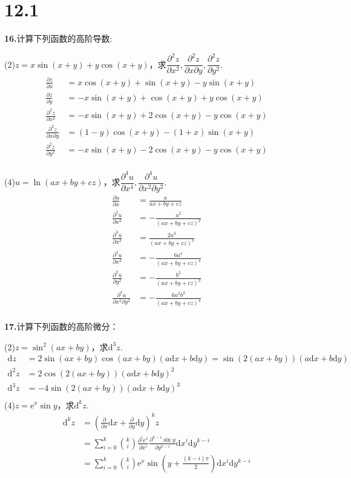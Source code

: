 \documentclass[12pt, a4paper]{article}
\newcommand{\e}{\mathrm{e}}
\newcommand{\dif}{\mathrm{d}}
\begin{document}
\section*{12.1}
\textbf{16.}计算下列函数的高阶导数:

(2)\(z = x\sin(x + y) + y\cos(x + y)\)，求\(\dfrac{\partial^2 z}{\partial x^2}, \dfrac{\partial^2 z}{\partial x \partial y}, \dfrac{\partial^2 z}{\partial y^2}\).
\begin{align*}
\frac{\partial z}{\partial x} &= x\cos(x + y) + \sin(x + y) - y\sin(x + y) \\
\frac{\partial z}{\partial y} &= -x\sin(x + y) + \cos(x + y) + y\cos(x + y) \\
\frac{\partial^2 z}{\partial x^2} &= -x\sin(x + y) + 2\cos(x + y) - y\cos(x + y) \\
\frac{\partial^2 z}{\partial x \partial y} &= (1 - y)\cos(x + y) - (1 + x)\sin(x + y) \\
\frac{\partial^2 z}{\partial y^2} &= -x\sin(x + y) - 2\cos(x + y) - y\cos(x + y) \\
\end{align*}

(4)\(u = \ln(ax + by + cz)\)，求\(\dfrac{\partial^4 u}{\partial x^4}, \dfrac{\partial^4 u}{\partial x^2 \partial y^2}\).
\begin{align*}
\frac{\partial u}{\partial x} &= \frac{a}{ax + by + cz} \\
\frac{\partial^2 u}{\partial x^2} &= -\frac{a^2}{(ax + by + cz)^2} \\
\frac{\partial^3 u}{\partial x^3} &= \frac{2a^3}{(ax + by + cz)^3} \\
\frac{\partial^4 u}{\partial x^4} &= -\frac{6a^4}{(ax + by + cz)^4} \\
\frac{\partial^2 u}{\partial y^2} &= -\frac{b^2}{(ax + by + cz)^2} \\
\frac{\partial^4 u}{\partial x^2 \partial y^2} &= -\frac{6a^2b^2}{(ax + by + cz)^4} \\
\end{align*}

\textbf{17.}计算下列函数的高阶微分：

(2)\(z = \sin^2 (ax + by)\)，求\(\dif^3 z\).
\begin{align*}
\dif z &= 2\sin(ax + by)\cos(ax + by)(a \dif x + b \dif y) = \sin(2(ax + by))(a \dif x + b \dif y) \\
\dif^2 z &= 2\cos(2(ax + by))(a \dif x + b \dif y)^2 \\
\dif^3 z &= -4\sin(2(ax + by))(a \dif x + b \dif y)^3 \\
\end{align*}
(4)\(z = \e^x \sin y\)，求\(\dif^k z\).
\begin{align*}
\dif^k z &= \left(\frac{\partial}{\partial x}\dif x + \frac{\partial}{\partial y}\dif y\right)^k  z \\
&= \sum_{i = 0}^{k} \binom{k}{i} \frac{\partial^i \e^x}{\partial x^i} \frac{\partial^{k - i} \sin y}{\partial y^{k - i}} \dif x^i \dif y^{k - i} \\
&= \sum_{i = 0}^{k} \binom{k}{i} \e^x \sin\left(y + \frac{(k - i)\pi}{2}\right) \dif x^i \dif y^{k - i} \\
\end{align*}
\end{document}
